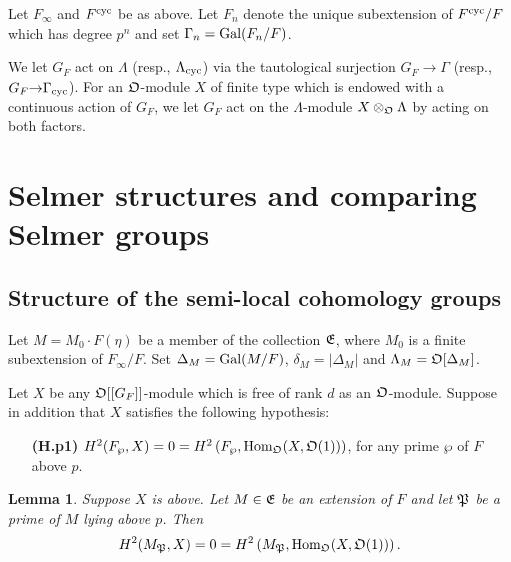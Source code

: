 \documentclass[12pt]{amsart}
\numberwithin{equation}{section}
\newtheorem{lemma}[thm]{Lemma}
\begin{document}
Let $F_\infty$ and $F^{\textup{cyc}}$ be as above. Let $F_n$ denote the unique subextension of $F^\textup{cyc}/F$ which has degree $p^n$ and set $\Gamma_n=\textup{Gal}(F_n/F)$.

We let $G_F$ act on ${\Lambda}$ (resp., ${\Lambda}_{\textup{cyc}}$) via the tautological surjection $G_F{\rightarrow} \Gamma$ (resp., $G_F{\rightarrow} \Gamma_{\textup{cyc}}$). For an ${\frak{O}}$-module $X$ of finite type which is endowed with a continuous action of $G_F$, we let $G_F$ act on the ${\Lambda}$-module $X\otimes_{\frak{O}}{\Lambda}$ by acting on both factors.

\section{Selmer structures and comparing Selmer groups}
\label{sec:selmerstructures}
\subsection{Structure of the semi-local cohomology groups}
\label{subsec:localanalysis}
Let $M=M_0\cdot F(\eta)$ be a member of the collection $\frak{E}$, where $M_0$ is a finite subextension of $F_\infty/F$. Set $\Delta_M=\textup{Gal}(M/F)$, $\delta_M=|\Delta_M|$ and ${\Lambda}_M=\frak{O}[\Delta_M]$.

Let $X$ be any $\frak{O}[[G_F]]$-module which is free of rank $d$ as an ${\frak{O}}$-module. Suppose in addition that $X$ satisfies the following hypothesis:
\begin{enumerate}
\item[\textbf{(H.p1)}] $H^2(F_\wp,X)=0=H^2\left(F_\wp,\textup{Hom}_{\frak{O}}(X,{\frak{O}}(1))\right)$, for any prime $\wp$ of $F$ above $p$.
\end{enumerate}

\begin{lemma}
\label{lem:extendp1toM}
Suppose $X$ is above. Let $M \in \frak{E}$ be an extension of $F$ and let $\frak{P}$ be a prime of $M$ lying above $p$. Then
 $$H^2(M_\frak{P},X)=0=H^2\left(M_\frak{P},\textup{Hom}_{\frak{O}}(X,{\frak{O}}(1))\right).$$
\end{lemma}
\end{document}
